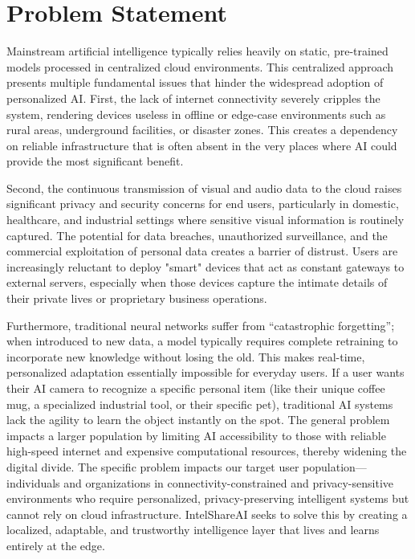 \documentclass[12pt,a4paper]{report}
\begin{document}
\section{Problem Statement}
Mainstream artificial intelligence typically relies heavily on static, pre-trained models processed in centralized cloud environments. This centralized approach presents multiple fundamental issues that hinder the widespread adoption of personalized AI. First, the lack of internet connectivity severely cripples the system, rendering devices useless in offline or edge-case environments such as rural areas, underground facilities, or disaster zones. This creates a dependency on reliable infrastructure that is often absent in the very places where AI could provide the most significant benefit.

Second, the continuous transmission of visual and audio data to the cloud raises significant privacy and security concerns for end users, particularly in domestic, healthcare, and industrial settings where sensitive visual information is routinely captured. The potential for data breaches, unauthorized surveillance, and the commercial exploitation of personal data creates a barrier of distrust. Users are increasingly reluctant to deploy "smart" devices that act as constant gateways to external servers, especially when those devices capture the intimate details of their private lives or proprietary business operations.

Furthermore, traditional neural networks suffer from ``catastrophic forgetting''; when introduced to new data, a model typically requires complete retraining to incorporate new knowledge without losing the old. This makes real-time, personalized adaptation essentially impossible for everyday users. If a user wants their AI camera to recognize a specific personal item (like their unique coffee mug, a specialized industrial tool, or their specific pet), traditional AI systems lack the agility to learn the object instantly on the spot. The general problem impacts a larger population by limiting AI accessibility to those with reliable high-speed internet and expensive computational resources, thereby widening the digital divide. The specific problem impacts our target user population---individuals and organizations in connectivity-constrained and privacy-sensitive environments who require personalized, privacy-preserving intelligent systems but cannot rely on cloud infrastructure. IntelShareAI seeks to solve this by creating a localized, adaptable, and trustworthy intelligence layer that lives and learns entirely at the edge.
\end{document}
